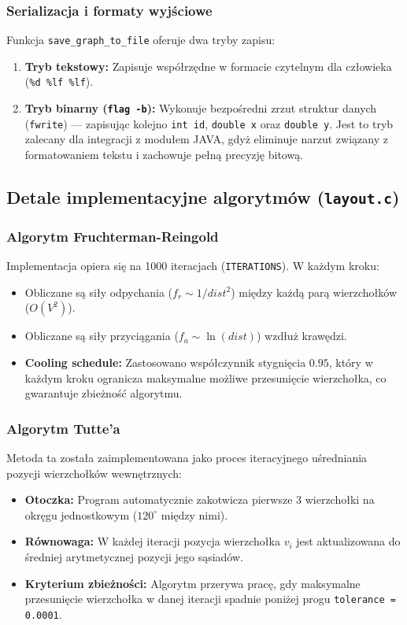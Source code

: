\documentclass[12pt,a4paper]{article}
\begin{document}
\subsubsection{Serializacja i formaty wyjściowe}
Funkcja \texttt{save\_graph\_to\_file} oferuje dwa tryby zapisu:
\begin{enumerate}
    \item \textbf{Tryb tekstowy:} Zapisuje współrzędne w formacie czytelnym dla człowieka (\texttt{\%d \%lf \%lf}).
    \item \textbf{Tryb binarny (\texttt{flag -b}):} Wykonuje bezpośredni zrzut struktur danych (\texttt{fwrite}) — zapisując kolejno \texttt{int id}, \texttt{double x} oraz \texttt{double y}. Jest to tryb zalecany dla integracji z modułem JAVA, gdyż eliminuje narzut związany z formatowaniem tekstu i zachowuje pełną precyzję bitową.
\end{enumerate}

\subsection{Detale implementacyjne algorytmów (\texttt{layout.c})}

\subsubsection{Algorytm Fruchterman-Reingold}
Implementacja opiera się na 1000 iteracjach (\texttt{ITERATIONS}). W każdym kroku:
\begin{itemize}
    \item Obliczane są siły odpychania ($f_r \sim 1/dist^2$) między każdą parą wierzchołków ($O(V^2)$).
    \item Obliczane są siły przyciągania ($f_a \sim \ln(dist)$) wzdłuż krawędzi.
    \item \textbf{Cooling schedule:} Zastosowano współczynnik stygnięcia $0.95$, który w każdym kroku ogranicza maksymalne możliwe przesunięcie wierzchołka, co gwarantuje zbieżność algorytmu.
\end{itemize}

\subsubsection{Algorytm Tutte'a}
Metoda ta została zaimplementowana jako proces iteracyjnego uśredniania pozycji wierzchołków wewnętrznych:
\begin{itemize}
    \item \textbf{Otoczka:} Program automatycznie zakotwicza pierwsze 3 wierzchołki na okręgu jednostkowym ($120^\circ$ między nimi).
    \item \textbf{Równowaga:} W każdej iteracji pozycja wierzchołka $v_i$ jest aktualizowana do średniej arytmetycznej pozycji jego sąsiadów. 
    \item \textbf{Kryterium zbieżności:} Algorytm przerywa pracę, gdy maksymalne przesunięcie wierzchołka w danej iteracji spadnie poniżej progu \texttt{tolerance = 0.0001}.
\end{itemize}
\end{document}
